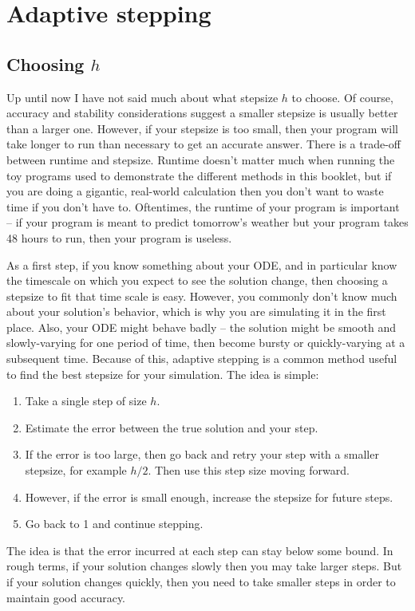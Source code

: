 \documentclass[hidelinks,notitlepage]{book}
\begin{document}
\chapter{Adaptive stepping}
\section{Choosing $h$}
Up until now I have not said much about what stepsize $h$ to choose.  Of course, accuracy and stability considerations suggest a smaller stepsize is usually better than a larger one.  However, if your stepsize is too small, then your program will take longer to run than necessary to get an accurate answer.  There is a trade-off between runtime and stepsize.  Runtime doesn't matter much when running the toy programs used to demonstrate the different methods in this booklet, but if you are doing a gigantic, real-world calculation then you don't want to waste time if you don't have to.  Oftentimes, the runtime of your program is important -- if your program is meant to predict tomorrow's weather but your program takes 48 hours to run, then your program is useless.

As a first step, if you know something about your ODE, and in particular know the timescale on which you expect to see the solution change, then choosing a stepsize to fit that time scale is easy.  However, you commonly don't know much about your solution's behavior, which is why you are simulating it in the first place.  Also, your ODE might behave badly -- the solution might be smooth and slowly-varying for one period of time, then become bursty or quickly-varying at a subsequent time.  Because of this, adaptive stepping is a common method useful to find the best stepsize for your simulation.  The idea is simple:
\begin{enumerate}
	\item Take a single step of size $h$.
	\item Estimate the error between the true solution and your step.
	\item If the error is too large, then go back and retry your step with a smaller stepsize, for example $h/2$.  Then use this step size moving forward.
	\item However, if the error is small enough, increase the stepsize for future steps.
	\item Go back to 1 and continue stepping.
\end{enumerate}
The idea is that the error incurred at each step can stay below some bound.  In rough terms, if your solution changes slowly then you may take larger steps.  But if your solution changes quickly, then you need to take smaller steps in order to maintain good accuracy.
\end{document}
